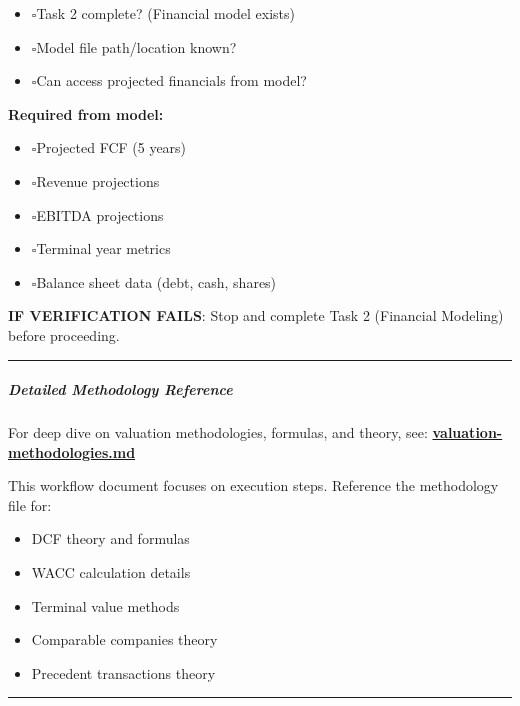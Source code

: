 \documentclass[11pt]{article}
\newcommand{\UncheckedBox}{$\square$}
\begin{document}
\begin{itemize}[leftmargin=*,itemsep=2pt,topsep=2pt]
\item {} \UncheckedBox Task 2 complete? (Financial model exists)
\item {} \UncheckedBox Model file path/location known?
\item {} \UncheckedBox Can access projected financials from model?
\end{itemize}

\textbf{Required from model:}

\begin{itemize}[leftmargin=*,itemsep=2pt,topsep=2pt]
\item {} \UncheckedBox Projected FCF (5 years)
\item {} \UncheckedBox Revenue projections
\item {} \UncheckedBox EBITDA projections
\item {} \UncheckedBox Terminal year metrics
\item {} \UncheckedBox Balance sheet data (debt, cash, shares)
\end{itemize}

\textbf{IF VERIFICATION FAILS}: Stop and complete Task 2 (Financial Modeling) before proceeding.


\vspace{0.5em}\hrule\vspace{0.5em}

\subparagraph{Detailed Methodology Reference}\mbox{}\par

For deep dive on valuation methodologies, formulas, and theory, see: \textbf{\href{valuation-methodologies.md}{valuation-methodologies.md}}


This workflow document focuses on execution steps. Reference the methodology file for:

\begin{itemize}[leftmargin=*,itemsep=2pt,topsep=2pt]
\item {} DCF theory and formulas
\item {} WACC calculation details
\item {} Terminal value methods
\item {} Comparable companies theory
\item {} Precedent transactions theory
\end{itemize}

\vspace{0.5em}\hrule\vspace{0.5em}
\end{document}
